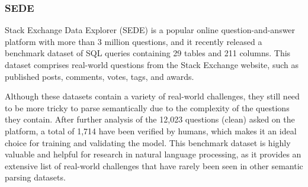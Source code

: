 \subsubsection{SEDE}

Stack Exchange Data Explorer (SEDE)\cite{DBLP:journals/corr/abs-2106-05006} is a popular online question-and-answer platform with more than 3 million questions, and it recently released a benchmark dataset of SQL queries containing 29 tables and 211 columns. This dataset comprises real-world questions from the Stack Exchange website, such as published posts, comments, votes, tags, and awards.

Although these datasets contain a variety of real-world challenges, they still need to be more tricky to parse semantically due to the complexity of the questions they contain. After further analysis of the 12,023 questions (clean) asked on the platform, a total of 1,714 have been verified by humans, which makes it an ideal choice for training and validating the model. This benchmark dataset is highly valuable and helpful for research in natural language processing, as it provides an extensive list of real-world challenges that have rarely been seen in other semantic parsing datasets.
